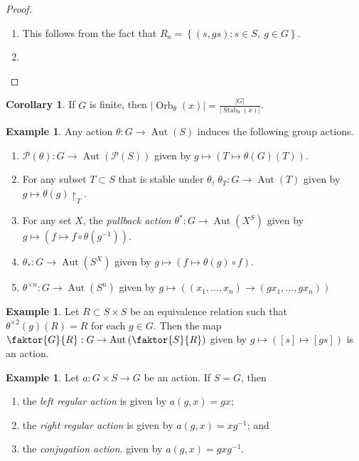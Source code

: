 \documentclass[10pt,letterpaper,cm]{nupset}
\theoremstyle{definition}
\newtheorem{exmp}[definition]{Example}
\theoremstyle{theorem}
\newtheorem{corollary}[definition]{Corollary}
\theoremstyle{remark}
\newcommand{\1}{\mathbf{1}}
\newcommand{\0}{\vec 0}
\DeclareMathOperator{\aut}{Aut}
\DeclareMathOperator{\stab}{Stab}
\DeclareMathOperator{\orb}{Orb}
\begin{document}
\begin{proof} $ $
\begin{enumerate}
\item This follows from the fact that $R_a = \left\{(s, gs): s \in S, \ g\in G\right\}$.
\item
\end{enumerate}
\end{proof}

\begin{corollary}
If $G$ is finite, then $\lvert{\orb_{\theta}(x)}\rvert = \frac{ \lvert{G}\rvert}{\lvert{\stab_{\theta}(x)}\rvert}$.
\end{corollary}

\medskip

\begin{exmp}
Any action $\theta : G \to \aut(S)$ induces the following group actions.
\begin{enumerate}
\item $\mathcal{P}(\theta) : G \to \aut(\mathcal{P}(S))$ given by $g \mapsto \left(T \mapsto \theta(G)(T)\right)$.
\item For any subset $T \subset S$ that is stable under $\theta$, $\theta_T : G \to \aut(T)$ given by $g \mapsto \theta(g)\restriction_T$.
\item For any set $X$, the \textit{pullback action} $\theta^\ast : G \to \aut(X^S)$ given by $g \mapsto \left(f \mapsto f \circ \theta(g^{-1})\right)$.
\item $\theta_{\ast}: G \to \aut(S^X)$ given by $g\mapsto \left(f \mapsto \theta(g) \circ f\right)$.
\item $\theta^{\times n} : G \to \aut(S^n)$ given by $g \mapsto \left((x_1, \ldots, x_n) \to (gx_1, \ldots, gx_n)\right)$
\end{enumerate}
\end{exmp}

\begin{exmp}
Let $R\subset S \times S$ be an equivalence relation such that $\theta^{\times 2}(g)(R) = R$ for each $g 
\in G$. Then the map $\faktor{G}{R}: G \to \aut\left(\faktor{S}{R}\right)$ given by $g \mapsto \left([s] \mapsto [gs]\right)$ is an action.
\end{exmp}

\begin{exmp}
Let $a : G \times S \to G$ be an action. If $S = G$, then 
\begin{enumerate}[label=(\alph*)]
\item the \textit{left regular action} is given by $a(g, x) = gx$; 
\item the \textit{right regular action} is given by $a(g, x) = xg^{-1}$; and 
\item the \textit{conjugation action}. given by $a(g, x) = gx g^{-1}$.
\end{enumerate}
\end{exmp}
\end{document}
